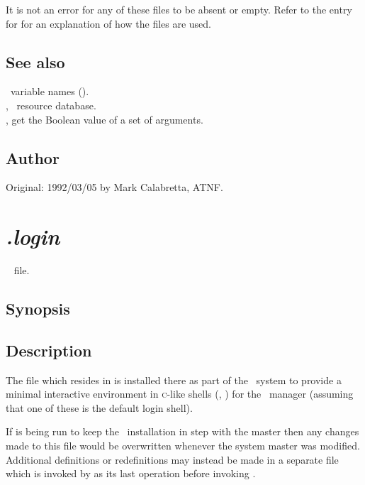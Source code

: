 \noindent
It is not an error for any of these files to be absent or empty.  Refer to
the entry for  for an explanation of how the 
files are used.

\subsection*{See also}

\aipspp\ variable names ().\\
, \aipspp\ resource database.\\
, get the Boolean value of a set of arguments.

\subsection*{Author}

Original: 1992/03/05 by Mark Calabretta, ATNF.


\newpage
\section{\textit{.login}}
\label{.login}

\aipspp\  file.

\subsection*{Synopsis}

\begin{synopsis}
\end{synopsis}

\subsection*{Description}

The  file which resides in  is installed there
as part of the \aipspp\ system to provide a minimal interactive environment
in \textsc{c}-like shells (, ) for the \aipspp\ 
manager (assuming that one of these is the default login shell).

If  is being run to keep the \aipspp\ installation in step with
the master then any changes made to this file would be overwritten whenever
the system master was modified.  Additional definitions or redefinitions may
instead be made in a separate \file{.login\_local} file which is invoked by
\filref{.login} as its last operation before invoking
.

